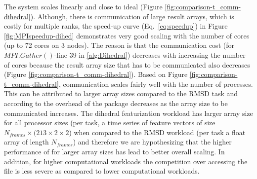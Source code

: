 The system scales linearly and close to ideal (Figure \ref{fig:comparison-t_comm-dihedral}). Although, there is communication of large
result arrays, which is costly for multiple ranks, the speed-up curve (Eq.~\ref{eq:speedup}) in Figure \ref{fig:MPIspeedup-dihed}
demonstrates very good scaling with the number of cores (up to 72 cores on 3 nodes).  The reason is that the communication cost (for
$MPI.Gather()$-line 39 in \ref{alg:Dihedral}) decreases with increasing the number of cores because the result array size that has to be
communicated also decreases (Figure \ref{fig:comparison-t_comm-dihedral}).  Based on Figure \ref{fig:comparison-t_comm-dihedral}, communication scales fairly well
with the number of processes. This can be attributed to larger array sizes compared to the RMSD task and according to \cite{Dalcin:2011aa}
the overhead of the  package decreases as the array size to be communicated increases. The dihedral featurization workload
has larger array size for all processor sizes (per task, a time series of feature vectors of size $N_{frames} \times (213 \times 2 \times 2$) when
compared to the RMSD workload (per task a float array of length $N_{frames}$) and therefore we are hypothesizing that the higher
performance of  for larger array sizes has lead to better overall scaling. 
In addition, for higher computational workloads the competition over accessing the file is less severe as compared to lower computational workloads. 
 
